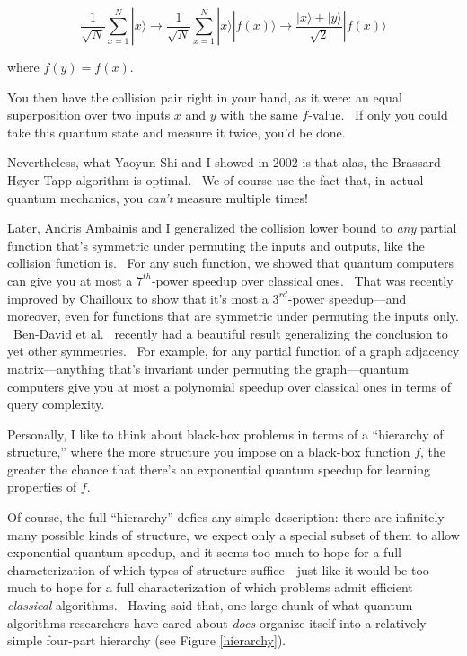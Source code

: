 \documentclass[11pt]{article}
\begin{document}
$$ \frac{1}{\sqrt{N}} \sum_{x=1}^{N} |x\rangle \rightarrow \frac{1}{\sqrt{N}} \sum_{x=1}^{N} |x\rangle |f(x)\rangle \rightarrow \frac{|x\rangle+|y\rangle}{\sqrt{2}} |f(x)\rangle$$

\noindent where $f(y)=f(x)$.

You then have the collision pair right in your hand, as it were: an equal superposition over two inputs $x$ and $y$ with the same $f$-value. \ If only you could take this quantum state and measure it twice, you'd be done.

Nevertheless, what Yaoyun Shi and I showed in 2002 \cite{as} is that alas, the Brassard-H{\o}yer-Tapp algorithm is optimal. \ We of course use the fact that, in actual quantum mechanics, you \emph{can't} measure multiple times!

Later, Andris Ambainis and I \cite{aa:struc} generalized the collision lower bound to \emph{any} partial function that's symmetric under permuting the inputs and outputs, like the collision function is. \ For any such function, we showed that quantum computers can give you at most a $7^{th}$-power speedup over classical ones. \ That was recently improved by Chailloux \cite{chailloux} to show that it's most a $3^{rd}$-power speedup---and moreover, even for functions that are symmetric under permuting the inputs only. \ Ben-David et al.\ \cite{bendavid:symmetry} recently had a beautiful result generalizing the conclusion to yet other symmetries. \ For example, for any partial function of a graph adjacency matrix---anything that's invariant under permuting the graph---quantum computers give you at most a polynomial speedup over classical ones in terms of query complexity.

Personally, I like to think about black-box problems in terms of a ``hierarchy of structure,'' where the more structure you impose on a black-box function $f$, the greater the chance that there's an exponential quantum speedup for learning properties of $f$.

Of course, the full ``hierarchy'' defies any simple description: there are infinitely many possible kinds of structure, we expect only a special subset of them to allow exponential quantum speedup, and it seems too much to hope for a full characterization of which types of structure suffice---just like it would be too much to hope for a full characterization of which problems admit efficient \emph{classical} algorithms. \ Having said that, one large chunk of what quantum algorithms researchers have cared about \emph{does} organize itself into a relatively simple four-part hierarchy (see Figure \ref{hierarchy}).
\end{document}

